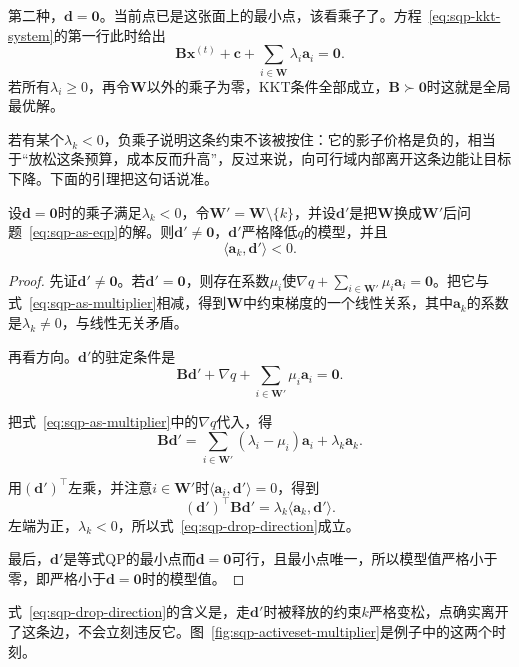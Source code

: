 第二种，$\bm{d}=\bm{0}$。当前点已是这张面上的最小点，该看乘子了。方程~\eqref{eq:sqp-kkt-system}的第一行此时给出
\begin{equation}
 \bm{B}\bm{x}^{(t)}+\bm{c}+\sum_{i\in\bm{W}}\lambda_i\bm{a}_i=\bm{0}.
 \label{eq:sqp-as-multiplier}
\end{equation}
若所有$\lambda_i\geq0$，再令$\bm{W}$以外的乘子为零，KKT条件全部成立，$\bm{B}\succ\bm{0}$时这就是全局最优解。

若有某个$\lambda_k<0$，负乘子说明这条约束不该被按住：它的影子价格是负的，相当于“放松这条预算，成本反而升高”，反过来说，向可行域内部离开这条边能让目标下降。下面的引理把这句话说准。

\begin{lemma}[释放负乘子约束]
\label{lem:sqp-drop}
设$\bm{d}=\bm{0}$时的乘子满足$\lambda_k<0$，令$\bm{W}'=\bm{W}\setminus\{k\}$，并设$\bm{d}'$是把$\bm{W}$换成$\bm{W}'$后问题~\eqref{eq:sqp-as-eqp}的解。则$\bm{d}'\neq\bm{0}$，$\bm{d}'$严格降低$q$的模型，并且
\begin{equation}
 \langle\bm{a}_k,\bm{d}'\rangle<0.
 \label{eq:sqp-drop-direction}
\end{equation}
\end{lemma}

\begin{proof}
先证$\bm{d}'\neq\bm{0}$。若$\bm{d}'=\bm{0}$，则存在系数$\mu_i$使$\nabla q+\sum_{i\in\bm{W}'}\mu_i\bm{a}_i=\bm{0}$。把它与式~\eqref{eq:sqp-as-multiplier}相减，得到$\bm{W}$中约束梯度的一个线性关系，其中$\bm{a}_k$的系数是$\lambda_k\neq0$，与线性无关矛盾。

再看方向。$\bm{d}'$的驻定条件是
\[
 \bm{B}\bm{d}'+\nabla q+\sum_{i\in\bm{W}'}\mu_i\bm{a}_i=\bm{0}.
\]

把式~\eqref{eq:sqp-as-multiplier}中的$\nabla q$代入，得
\[
 \bm{B}\bm{d}'=\sum_{i\in\bm{W}'}(\lambda_i-\mu_i)\bm{a}_i+\lambda_k\bm{a}_k.
\]

用$(\bm{d}')^\top$左乘，并注意$i\in\bm{W}'$时$\langle\bm{a}_i,\bm{d}'\rangle=0$，得到
\[
 (\bm{d}')^\top\bm{B}\bm{d}'=\lambda_k\langle\bm{a}_k,\bm{d}'\rangle.
\]
左端为正，$\lambda_k<0$，所以式~\eqref{eq:sqp-drop-direction}成立。

最后，$\bm{d}'$是等式QP的最小点而$\bm{d}=\bm{0}$可行，且最小点唯一，所以模型值严格小于零，即严格小于$\bm{d}=\bm{0}$时的模型值。
\end{proof}

式~\eqref{eq:sqp-drop-direction}的含义是，走$\bm{d}'$时被释放的约束$k$严格变松，点确实离开了这条边，不会立刻违反它。图~\ref{fig:sqp-activeset-multiplier}是例子中的这两个时刻。

